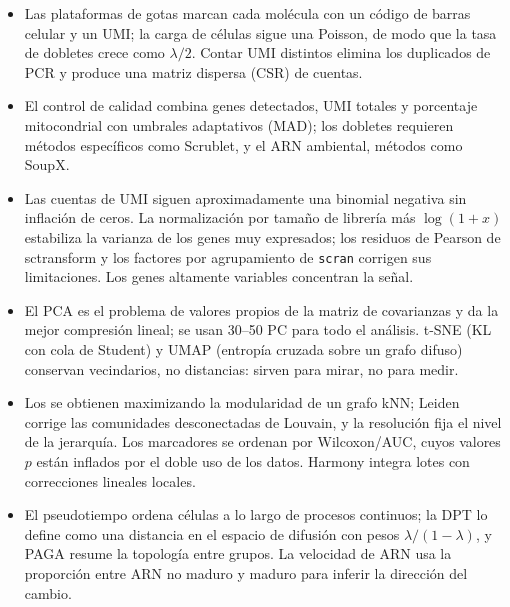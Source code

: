 \begin{resumen}
\begin{itemize}
  \item Las plataformas de gotas marcan cada molécula con un código de barras celular y un UMI; la carga de células sigue una Poisson, de modo que la tasa de dobletes crece como $\lambda/2$. Contar UMI distintos elimina los duplicados de PCR y produce una matriz dispersa (CSR) de cuentas.
  \item El control de calidad combina genes detectados, UMI totales y porcentaje mitocondrial con umbrales adaptativos (MAD); los dobletes requieren métodos específicos como Scrublet, y el ARN ambiental, métodos como SoupX.
  \item Las cuentas de UMI siguen aproximadamente una binomial negativa sin inflación de ceros. La normalización por tamaño de librería más $\log(1+x)$ estabiliza la varianza de los genes muy expresados; los residuos de Pearson de sctransform y los factores por agrupamiento de \texttt{scran} corrigen sus limitaciones. Los genes altamente variables concentran la señal.
  \item El PCA es el problema de valores propios de la matriz de covarianzas y da la mejor compresión lineal; se usan 30--50 PC para todo el análisis. t-SNE (KL con cola de Student) y UMAP (entropía cruzada sobre un grafo difuso) conservan vecindarios, no distancias: sirven para mirar, no para medir.
  \item Los  se obtienen maximizando la modularidad de un grafo kNN; Leiden corrige las comunidades desconectadas de Louvain, y la resolución fija el nivel de la jerarquía. Los marcadores se ordenan por Wilcoxon/AUC, cuyos valores $p$ están inflados por el doble uso de los datos. Harmony integra lotes con correcciones lineales locales.
  \item El pseudotiempo ordena células a lo largo de procesos continuos; la DPT lo define como una distancia en el espacio de difusión con pesos $\lambda/(1-\lambda)$, y PAGA resume la topología entre grupos. La velocidad de ARN usa la proporción entre ARN no maduro y maduro para inferir la dirección del cambio.
\end{itemize}
\end{resumen}

